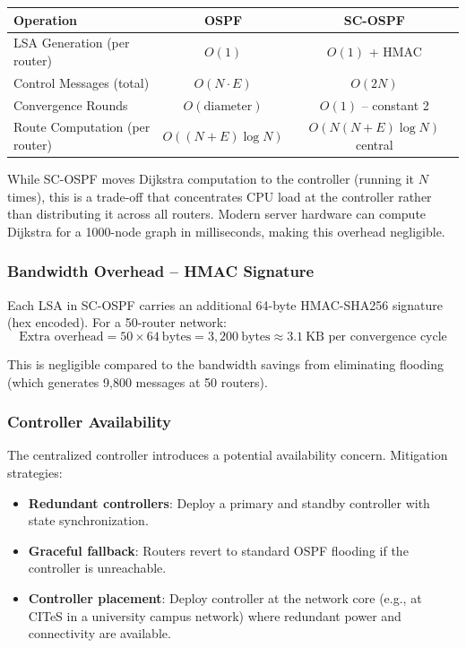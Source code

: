 \documentclass[12pt,a4paper]{article}
\begin{document}
\begin{center}
\begin{tabular}{lcc}
\toprule
\textbf{Operation} & \textbf{OSPF} & \textbf{SC-OSPF} \\
\midrule
LSA Generation (per router) & $O(1)$ & $O(1)$ + HMAC \\
Control Messages (total) & $O(N \cdot E)$ & $O(2N)$ \\
Convergence Rounds & $O(\text{diameter})$ & $O(1)$ -- constant 2 \\
Route Computation (per router) & $O((N+E)\log N)$ & $O(N(N+E)\log N)$ central \\
\bottomrule
\end{tabular}
\end{center}

While SC-OSPF moves Dijkstra computation to the controller (running it $N$ times),
this is a trade-off that concentrates CPU load at the controller rather than
distributing it across all routers. Modern server hardware can compute Dijkstra
for a 1000-node graph in milliseconds, making this overhead negligible.

\subsubsection{Bandwidth Overhead -- HMAC Signature}

Each LSA in SC-OSPF carries an additional 64-byte HMAC-SHA256 signature (hex
encoded). For a 50-router network:
\[
\text{Extra overhead} = 50 \times 64\ \text{bytes} = 3,200\ \text{bytes} \approx 3.1\ \text{KB per convergence cycle}
\]

This is negligible compared to the bandwidth savings from eliminating flooding
(which generates 9,800 messages at 50 routers).

\subsubsection{Controller Availability}

The centralized controller introduces a potential availability concern. Mitigation
strategies:
\begin{itemize}[itemsep=3pt]
  \item \textbf{Redundant controllers}: Deploy a primary and standby controller
  with state synchronization.
  \item \textbf{Graceful fallback}: Routers revert to standard OSPF flooding if
  the controller is unreachable.
  \item \textbf{Controller placement}: Deploy controller at the network core
  (e.g., at CITeS in a university campus network) where redundant power and
  connectivity are available.
\end{itemize}
\end{document}
